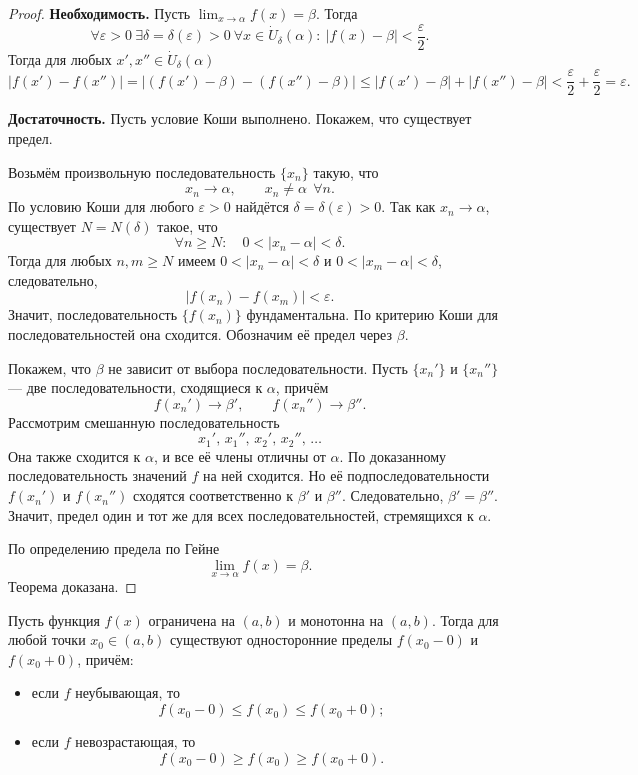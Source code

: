 \begin{proof}
\noindent\textbf{Необходимость.}
Пусть \(\lim_{x\to \alpha} f(x)=\beta\). Тогда
\[
\forall \varepsilon>0\ \exists \delta=\delta(\varepsilon)>0\
\forall x\in \dot U_\delta(\alpha):\
|f(x)-\beta|<\frac{\varepsilon}{2}.
\]
Тогда для любых \(x',x''\in \dot U_\delta(\alpha)\)
\[
|f(x')-f(x'')|
=
|(f(x')-\beta)-(f(x'')-\beta)|
\le
|f(x')-\beta|+|f(x'')-\beta|
<
\frac{\varepsilon}{2}+\frac{\varepsilon}{2}
=
\varepsilon.
\]

\medskip
\noindent\textbf{Достаточность.}
Пусть условие Коши выполнено. Покажем, что существует предел.

Возьмём произвольную последовательность \(\{x_n\}\) такую, что
\[
x_n\to \alpha,\qquad x_n\ne \alpha\ \ \forall n.
\]
По условию Коши для любого \(\varepsilon>0\) найдётся
\(\delta=\delta(\varepsilon)>0\).
Так как \(x_n\to \alpha\), существует \(N=N(\delta)\) такое, что
\[
\forall n\ge N:\quad 0<|x_n-\alpha|<\delta.
\]
Тогда для любых \(n,m\ge N\) имеем \(0<|x_n-\alpha|<\delta\) и
\(0<|x_m-\alpha|<\delta\), следовательно,
\[
|f(x_n)-f(x_m)|<\varepsilon.
\]
Значит, последовательность \(\{f(x_n)\}\) фундаментальна. По критерию Коши для
последовательностей она сходится. Обозначим её предел через \(\beta\).

Покажем, что \(\beta\) не зависит от выбора последовательности. Пусть
\(\{x_n'\}\) и \(\{x_n''\}\) --- две последовательности, сходящиеся к \(\alpha\),
причём
\[
f(x_n')\to \beta',\qquad f(x_n'')\to \beta''.
\]
Рассмотрим смешанную последовательность
\[
x_1',\,x_1'',\,x_2',\,x_2'',\,\ldots
\]
Она также сходится к \(\alpha\), и все её члены отличны от \(\alpha\). По
доказанному последовательность значений \(f\) на ней сходится. Но её
подпоследовательности \(f(x_n')\) и \(f(x_n'')\) сходятся соответственно к
\(\beta'\) и \(\beta''\). Следовательно, \(\beta'=\beta''\). Значит, предел один
и тот же для всех последовательностей, стремящихся к \(\alpha\).

По определению предела по Гейне
\[
\lim_{x\to \alpha} f(x)=\beta.
\]
Теорема доказана.
\end{proof}


\begin{theorem}
Пусть функция \(f(x)\) ограничена на \((a,b)\) и монотонна на \((a,b)\).
Тогда для любой точки \(x_0\in(a,b)\) существуют односторонние пределы
\(f(x_0-0)\) и \(f(x_0+0)\), причём:
\begin{itemize}
\item если \(f\) неубывающая, то
\[
f(x_0-0)\le f(x_0)\le f(x_0+0);
\]
\item если \(f\) невозрастающая, то
\[
f(x_0-0)\ge f(x_0)\ge f(x_0+0).
\]
\end{itemize}
\end{theorem}


